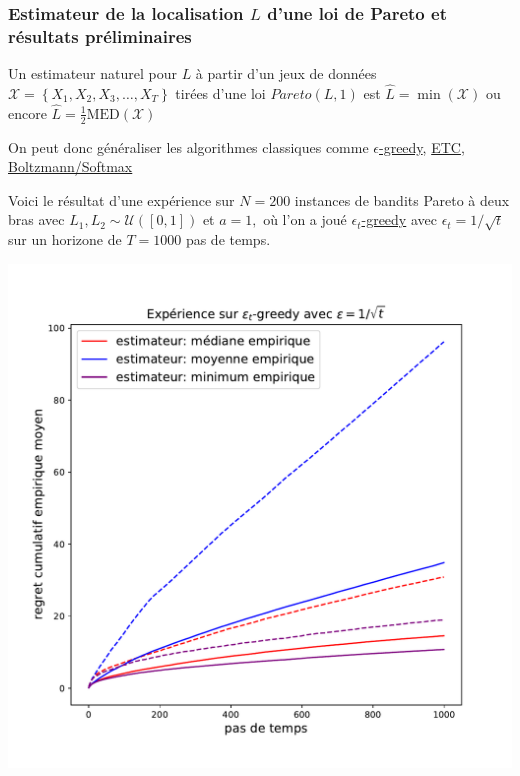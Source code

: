 \documentclass[8pt,sans,aspectratio=169]{beamer}
\begin{document}
\begin{frame}
\frametitle{Estimateur de la localisation $L$ d'une loi de Pareto et résultats préliminaires}
Un estimateur naturel pour $L$ à partir d'un jeux de données $\mathcal{X}=\left\{X_1,X_2,X_3,\ldots,X_T\right\}$ tirées d'une loi $Pareto(L,1)$ est $\widehat{L}=\min(\mathcal{X})$ ou encore $\widehat{L}=\frac{1}{2}\mathrm{MED}(\mathcal{X})$

\pause
\vfill

On peut donc généraliser les algorithmes classiques comme \underline{$\epsilon$-greedy}, \underline{ETC}, \underline{Boltzmann/Softmax}
  
\pause
\vfill

Voici le résultat d'une expérience sur $N=200$ instances de bandits Pareto à deux bras avec $L_1, L_2\sim\mathcal{U}([0,1])$ et $a=1,$ où l'on a joué \underline{$\epsilon_t$-greedy} avec $\epsilon_t=1/\sqrt{t}$ sur un horizone de $T=1000$ pas de temps.

\vfill

\begin{center}
\includegraphics[scale=0.25]{exp-Pareto.pdf}
\end{center}

\end{frame}
                          
\end{document}
